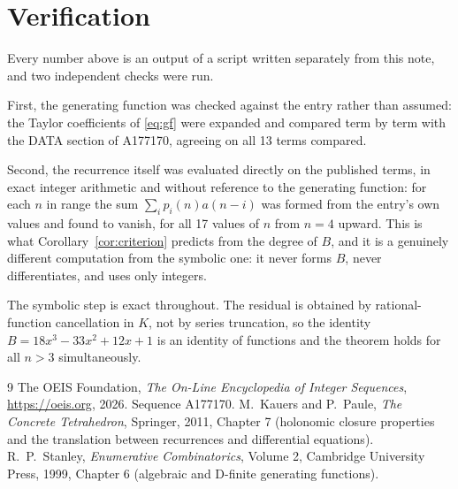 \documentclass[11pt,a4paper]{article}
\theoremstyle{plain}
\theoremstyle{definition}
\begin{document}
\section{Verification}

Every number above is an output of a script written separately from this note, and two
independent checks were run.

First, the generating function was checked against the entry rather than assumed: the
Taylor coefficients of \eqref{eq:gf} were expanded and compared term by term with the DATA
section of A177170, agreeing on all 13 terms compared.

Second, the recurrence itself was evaluated directly on the published terms, in exact
integer arithmetic and without reference to the generating function: for each $n$ in range
the sum $\sum_{i}p_{i}(n)a(n-i)$ was formed from the entry's own values and found to
vanish, for all 17 values of $n$ from $n=4$ upward. This is what
Corollary~\ref{cor:criterion} predicts from the degree of $B$, and it is a genuinely
different computation from the symbolic one: it never forms $B$, never differentiates, and
uses only integers.

The symbolic step is exact throughout. The residual is obtained by rational-function
cancellation in $K$, not by series truncation, so the identity $B=18 x^{3} - 33 x^{2} + 12 x + 1$ is an
identity of functions and the theorem holds for all $n>3$ simultaneously.

\begin{thebibliography}{9}
 The OEIS Foundation, \emph{The On-Line Encyclopedia of Integer Sequences},
\url{https://oeis.org}, 2026. Sequence A177170.
 M.~Kauers and P.~Paule, \emph{The Concrete Tetrahedron}, Springer, 2011,
Chapter 7 (holonomic closure properties and the translation between recurrences and
differential equations).
 R.~P.~Stanley, \emph{Enumerative Combinatorics}, Volume 2, Cambridge
University Press, 1999, Chapter 6 (algebraic and D-finite generating functions).
\end{thebibliography}
\end{document}
